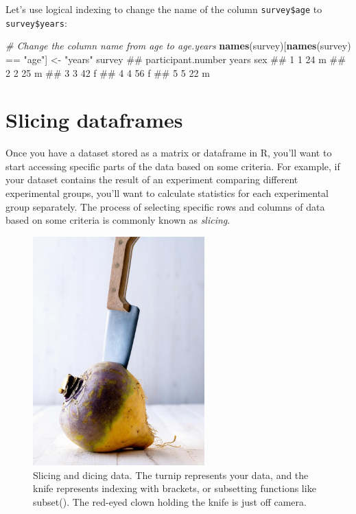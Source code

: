 \documentclass[]{book}
\newenvironment{Shaded}{\begin{snugshade}}{\end{snugshade}}
\newcommand{\KeywordTok}[1]{\textcolor[rgb]{0.13,0.29,0.53}{\textbf{{#1}}}}
\newcommand{\StringTok}[1]{\textcolor[rgb]{0.31,0.60,0.02}{{#1}}}
\newcommand{\CommentTok}[1]{\textcolor[rgb]{0.56,0.35,0.01}{\textit{{#1}}}}
\newcommand{\NormalTok}[1]{{#1}}
\theoremstyle{definition}
\theoremstyle{definition}
\theoremstyle{remark}
\begin{document}
Let's use logical indexing to change the name of the column
\texttt{survey\$age} to \texttt{survey\$years}:

\begin{Shaded}
\begin{Highlighting}[]
\CommentTok{# Change the column name from age to age.years}
\KeywordTok{names}\NormalTok{(survey)[}\KeywordTok{names}\NormalTok{(survey) ==}\StringTok{ "age"}\NormalTok{] <-}\StringTok{ "years"}
\NormalTok{survey}
\NormalTok{##   participant.number years sex}
\NormalTok{## 1                  1    24   m}
\NormalTok{## 2                  2    25   m}
\NormalTok{## 3                  3    42   f}
\NormalTok{## 4                  4    56   f}
\NormalTok{## 5                  5    22   m}
\end{Highlighting}
\end{Shaded}

\section{Slicing dataframes}\label{slicing-dataframes}

Once you have a dataset stored as a matrix or dataframe in R, you'll
want to start accessing specific parts of the data based on some
criteria. For example, if your dataset contains the result of an
experiment comparing different experimental groups, you'll want to
calculate statistics for each experimental group separately. The process
of selecting specific rows and columns of data based on some criteria is
commonly known as \emph{slicing}.

\begin{figure}

{\centering \includegraphics[width=250px]{images/turnip} 

}

\caption{Slicing and dicing data. The turnip represents your data, and the knife represents indexing with brackets, or subsetting functions like subset(). The red-eyed clown holding the knife is just off camera.}\label{fig:unnamed-chunk-190}
\end{figure}
\end{document}
